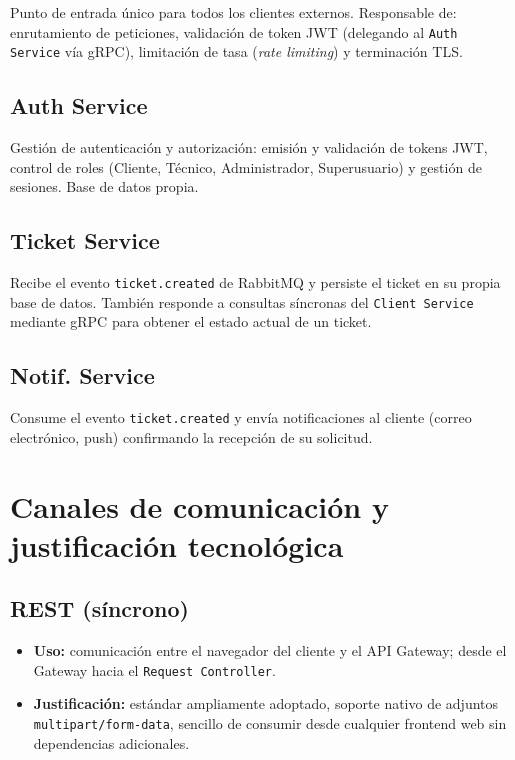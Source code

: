 \documentclass[12pt,a4paper]{article}
\begin{document}
Punto de entrada único para todos los clientes externos. Responsable de:
enrutamiento de peticiones, validación de token JWT (delegando al
\texttt{Auth Service} vía gRPC), limitación de tasa (\emph{rate limiting}) y
terminación TLS.

\subsection{Auth Service}

Gestión de autenticación y autorización: emisión y validación de tokens JWT,
control de roles (Cliente, Técnico, Administrador, Superusuario) y gestión de
sesiones. Base de datos propia.

\subsection{Ticket Service}

Recibe el evento \texttt{ticket.created} de RabbitMQ y persiste el ticket en su
propia base de datos. También responde a consultas síncronas del
\texttt{Client Service} mediante gRPC para obtener el estado actual de un ticket.

\subsection{Notif. Service}

Consume el evento \texttt{ticket.created} y envía notificaciones al cliente
(correo electrónico, push) confirmando la recepción de su solicitud.

\section{Canales de comunicación y justificación tecnológica}


\subsection{REST (síncrono)}

\begin{itemize}
  \item \textbf{Uso:} comunicación entre el navegador del cliente y el API Gateway;
        desde el Gateway hacia el \texttt{Request Controller}.
  \item \textbf{Justificación:} estándar ampliamente adoptado, soporte nativo de
        adjuntos \texttt{multipart/form-data}, sencillo de consumir desde cualquier
        frontend web sin dependencias adicionales.
\end{itemize}
\end{document}
